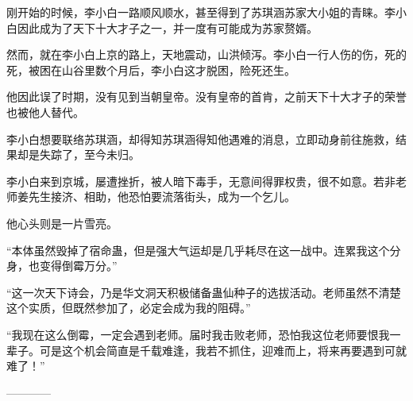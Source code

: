 \begin{this_body}
刚开始的时候，李小白一路顺风顺水，甚至得到了苏琪涵苏家大小姐的青睐。李小白因此成为了天下十大才子之一，并一度有可能成为苏家赘婿。

然而，就在李小白上京的路上，天地震动，山洪倾泻。李小白一行人伤的伤，死的死，被困在山谷里数个月后，李小白这才脱困，险死还生。

他因此误了时期，没有见到当朝皇帝。没有皇帝的首肯，之前天下十大才子的荣誉也被他人替代。

李小白想要联络苏琪涵，却得知苏琪涵得知他遇难的消息，立即动身前往施救，结果却是失踪了，至今未归。

李小白来到京城，屡遭挫折，被人暗下毒手，无意间得罪权贵，很不如意。若非老师姜先生接济、相助，他恐怕要流落街头，成为一个乞儿。

他心头则是一片雪亮。

“本体虽然毁掉了宿命蛊，但是强大气运却是几乎耗尽在这一战中。连累我这个分身，也变得倒霉万分。”

“这一次天下诗会，乃是华文洞天积极储备蛊仙种子的选拔活动。老师虽然不清楚这个实质，但既然参加了，必定会成为我的阻碍。”

“我现在这么倒霉，一定会遇到老师。届时我击败老师，恐怕我这位老师要恨我一辈子。可是这个机会简直是千载难逢，我若不抓住，迎难而上，将来再要遇到可就难了！”

------------

\end{this_body}


